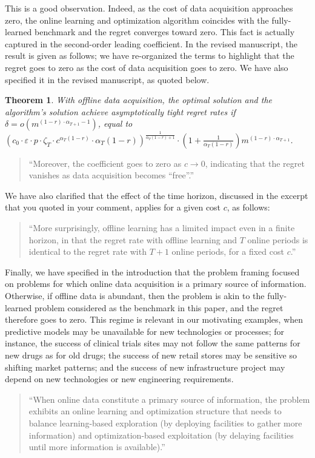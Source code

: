\documentclass[11pt]{article}
\newtheorem{theorem}{Theorem}[] %
\begin{document}
This is a good observation. Indeed, as the cost of data acquisition approaches zero, the online learning and optimization algorithm coincides with the fully-learned benchmark and the regret converges toward zero. This fact is actually captured in the second-order leading coefficient. In the revised manuscript, the result is given as follows; we have re-organized the terms to highlight that the regret goes to zero as the cost of data acquisition goes to zero. We have also specified it in the revised manuscript, as quoted below.
\setcounter{theorem}{2}
\begin{theorem}\label{thm:warmstart_R3}
	With offline data acquisition, the optimal solution and the algorithm's solution achieve asymptotically tight regret rates if $\delta = o\left(m^{(1-r)\cdot\alpha_{T+1}-1}\right)$, equal to\\ $\left(c_0\cdot\varepsilon\cdot p\cdot\zeta_T\cdot c^{\alpha_T(1-r)}\cdot\alpha_T(1-r)\right)^{\frac{1}{\alpha_T(1-r)+1}}\cdot \left(1+\frac{1}{\alpha_T(1-r)}\right)m^{(1-r)\cdot\alpha_{T+1}}$.
\end{theorem}
\begin{quote}
    ``Moreover, the coefficient goes to zero as $c\to0$, indicating that the regret vanishes as data acquisition becomes ``free''.''
\end{quote}

We have also clarified that the effect of the time horizon, discussed in the excerpt that you quoted in your comment, applies for a given cost $c$, as follows:
\begin{quote}
    ``More surprisingly, offline learning has a limited impact even in a finite horizon, in that the regret rate with offline learning and $T$ online periods is identical to the regret rate with $T+1$ online periods, for a fixed cost $c$.''
\end{quote}

Finally, we have specified in the introduction that the problem framing focused on problems for which online data acquisition is a primary source of information. Otherwise, if offline data is abundant, then the problem is akin to the fully-learned problem considered as the benchmark in this paper, and the regret therefore goes to zero. This regime is relevant in our motivating examples, when predictive models may be unavailable for new technologies or processes; for instance, the success of clinical trials sites may not follow the same patterns for new drugs as for old drugs; the success of new retail stores may be sensitive so shifting market patterns; and the success of new infrastructure project may depend on new technologies or new engineering requirements.
\begin{quote}
    ``When online data constitute a primary source of information, the problem exhibits an online learning and optimization structure that needs to balance learning-based exploration (by deploying facilities to gather more information) and optimization-based exploitation (by delaying facilities until more information is available).''
\end{quote}
\end{document}
